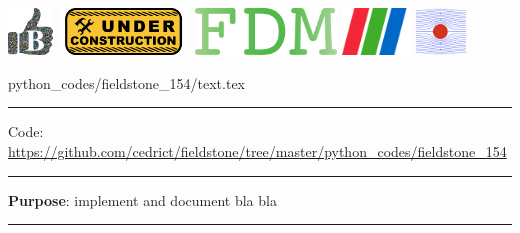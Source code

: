 \noindent
\includegraphics[height=1.25cm]{images/pictograms/benchmark}
\includegraphics[height=1.25cm]{images/pictograms/under_construction}
\includegraphics[height=1.25cm]{images/pictograms/FDM}
\includegraphics[height=1.25cm]{images/pictograms/paraview}
\includegraphics[height=1.25cm]{images/pictograms/streamfunction}


\begin{flushright} {\tiny {\color{gray} python\_codes/fieldstone\_154/text.tex}} \end{flushright}

%

\par\noindent\rule{\textwidth}{0.4pt}

\begin{center}
\inpython
{\small Code: \url{https://github.com/cedrict/fieldstone/tree/master/python_codes/fieldstone_154}}
\end{center}

\par\noindent\rule{\textwidth}{0.4pt}

{\bf \color{teal} Purpose}: implement and document bla bla 

\par\noindent\rule{\textwidth}{0.4pt}



